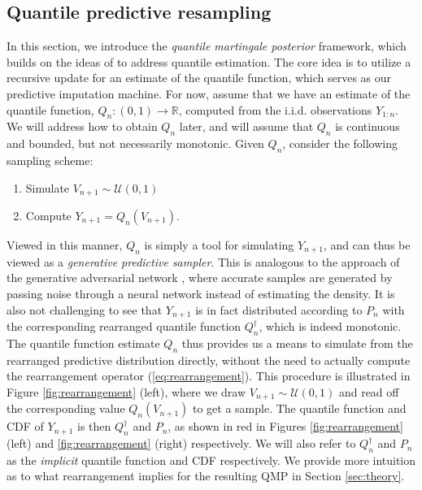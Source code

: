 \documentclass[11pt,a4paper]{article}
\newcommand{\R}{\mathbb{R}}
\begin{document}
\subsection{Quantile predictive resampling}\label{sec:PR}
In this section, we introduce the \textit{quantile martingale posterior} framework, which builds on the ideas of \cite{Fong2023a} to address quantile estimation. The core idea is to utilize a recursive update for an estimate of the quantile function, which serves as our predictive imputation machine. For now, assume that we have an estimate of the quantile function, $Q_n:(0,1) \to \R$, computed from the i.i.d. observations $Y_{1:n}$. We will address how to obtain $Q_n$ later, and will assume that $Q_n$ is continuous and bounded, but not necessarily monotonic. Given $Q_n$, consider the following sampling scheme:
\begin{enumerate}
    \item Simulate $V_{n+1} \sim \mathcal{U}(0,1)$
    \item Compute $Y_{n+1} = Q_n(V_{n+1})$.
\end{enumerate}
Viewed in this manner, $Q_n$ is simply a tool for simulating $Y_{n+1}$, and can thus be viewed as a \textit{generative predictive sampler}. This is analogous to the approach of the generative adversarial network \citep{Goodfellow2020}, where accurate samples are generated by passing noise through a neural network instead of estimating the density. It is also not challenging to see that $Y_{n+1}$ is in fact distributed according to $P_n$ with the corresponding rearranged quantile function $Q^{\dagger}_n$, which is indeed monotonic. The quantile function estimate $Q_n$ thus provides us a means to simulate from the rearranged predictive distribution directly, without the need to actually compute the rearrangement operator (\ref{eq:rearrangement}). This procedure is illustrated in {Figure \ref{fig:rearrangement} (left)}, where we draw $V_{n+1} \sim \mathcal{U}(0,1)$ and read off the corresponding value $Q_n(V_{n+1})$ to get a sample. The quantile function  and CDF of $Y_{n+1}$ is then $Q_n^{\dagger}$ and $P_n$, as shown in red in {Figures \ref{fig:rearrangement} (left)} and {\ref{fig:rearrangement} (right)} respectively. We will also refer to $Q_n^{\dagger}$ and $P_n$ as the \textit{implicit} quantile function and CDF respectively.
We provide more intuition as to what rearrangement implies for the resulting QMP in Section \ref{sec:theory}.
\end{document}
